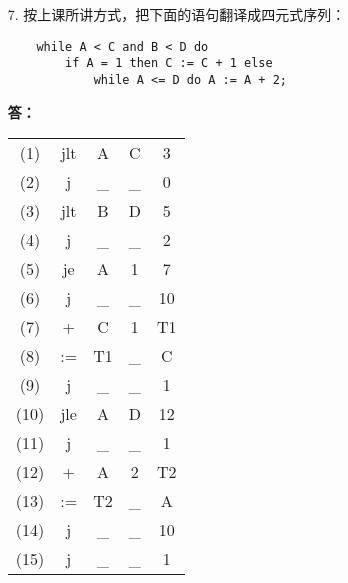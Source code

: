 \begin{enumerate}
\begin{enumerate}
    \end{enumerate}
    
    
    \item[7.] 按上课所讲方式，把下面的语句翻译成四元式序列：
    
    \begin{lstlisting}
    while A < C and B < D do
        if A = 1 then C := C + 1 else
            while A <= D do A := A + 2;
    \end{lstlisting}
    
    \textbf{答：}
    
    \begin{tabular}{ccccc}
        (1) & jlt & A & C & 3 \\
        (2) & j & _ & _ & 0 \\
        (3) & jlt & B & D & 5 \\
        (4) & j & _ & _ & 2 \\
        (5) & je & A & 1 & 7 \\
        (6) & j & _ & _ & 10 \\
        (7) & + & C & 1 & T1 \\
        (8) & := & T1 & _ & C \\
        (9) & j & _ & _ & 1 \\
        (10) & jle & A & D & 12 \\
        (11) & j & _ & _ & 1 \\
        (12) & + & A & 2 & T2 \\
        (13) & := & T2 & _ & A \\
        (14) & j & _ & _ & 10 \\
        (15) & j & _ & _ & 1 \\
    \end{tabular}
    
\end{enumerate}